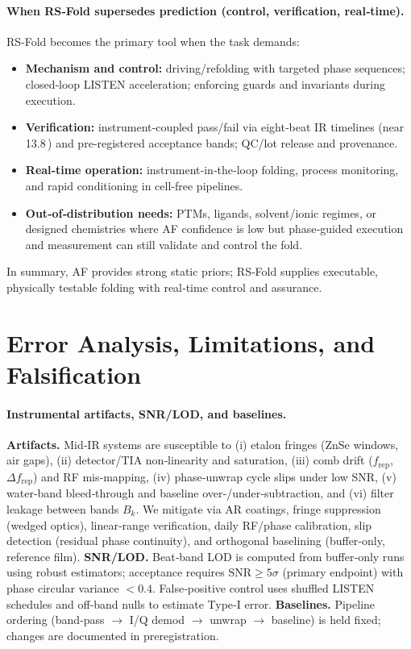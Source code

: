 \documentclass[12pt,a4paper]{article}
\begin{document}
\paragraph{When RS‑Fold supersedes prediction (control, verification, real‑time).}
RS‑Fold becomes the primary tool when the task demands:
\begin{itemize}
  \item \textbf{Mechanism and control:} driving/refolding with targeted phase sequences; closed‑loop LISTEN acceleration; enforcing guards and invariants during execution.
  \item \textbf{Verification:} instrument‑coupled pass/fail via eight‑beat IR timelines (near 13.8\,) and pre‑registered acceptance bands; QC/lot release and provenance.
  \item \textbf{Real‑time operation:} instrument‑in‑the‑loop folding, process monitoring, and rapid conditioning in cell‑free pipelines.
  \item \textbf{Out‑of‑distribution needs:} PTMs, ligands, solvent/ionic regimes, or designed chemistries where AF confidence is low but phase‑guided execution and measurement can still validate and control the fold.
\end{itemize}
In summary, AF provides strong static priors; RS‑Fold supplies executable, physically testable folding with real‑time control and assurance.

\section{Error Analysis, Limitations, and Falsification}

\paragraph{Instrumental artifacts, SNR/LOD, and baselines.}
\textbf{Artifacts.} Mid‑IR systems are susceptible to (i) etalon fringes (ZnSe windows, air gaps), (ii) detector/TIA non‑linearity and saturation, (iii) comb drift ($f_{\mathrm{rep}}$, $\Delta f_{\mathrm{rep}}$) and RF mis‑mapping, (iv) phase‑unwrap cycle slips under low SNR, (v) water‑band bleed‑through and baseline over‑/under‑subtraction, and (vi) filter leakage between bands $B_k$. We mitigate via AR coatings, fringe suppression (wedged optics), linear‑range verification, daily RF/phase calibration, slip detection (residual phase continuity), and orthogonal baselining (buffer‑only, reference film).
\textbf{SNR/LOD.} Beat‑band LOD is computed from buffer‑only runs using robust estimators; acceptance requires $\mathrm{SNR}\ge5\sigma$ (primary endpoint) with phase circular variance $<0.4$. False‑positive control uses shuffled LISTEN schedules and off‑band nulls to estimate Type‑I error. \textbf{Baselines.} Pipeline ordering (band‑pass $\to$ I/Q demod $\to$ unwrap $\to$ baseline) is held fixed; changes are documented in preregistration.
\end{document}
